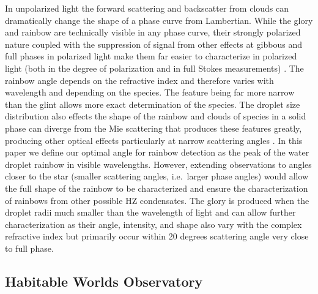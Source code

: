 \documentclass[
    usenatbib,
]{mnras}
\begin{document}
In unpolarized light the forward scattering and backscatter from clouds can dramatically change the shape of a phase curve from Lambertian.
%
While the glory and rainbow are technically visible in any phase curve, their strongly polarized nature coupled with the suppression of signal from other effects at gibbous and full phases in polarized light make them far easier to characterize in polarized light (both in the degree of polarization and in full Stokes measurements) \citep{karalidi2011, stam2008, treesandstam2019}.
%
The rainbow angle depends on the refractive index and therefore varies with wavelength and depending on the species.
%
The feature being far more narrow than the glint allows more exact determination of the species.
%
The droplet size distribution also effects the shape of the rainbow and clouds of species in a solid phase can diverge from the Mie scattering that produces these features greatly, producing other optical effects particularly at narrow scattering angles \citep{bailey2007, hansentravis1974, Karalidi2012ice}.
%
In this paper we define our optimal angle for rainbow detection as the peak of the water droplet rainbow in visible wavelengths.
%
However, extending observations to angles closer to the star (smaller scattering angles, i.e.\ larger phase angles) would allow the full shape of the rainbow to be characterized and ensure the characterization of rainbows from other possible HZ condensates.
%
The glory is produced when the droplet radii much smaller than the wavelength of light and can allow further characterization as their angle, intensity, and shape also vary with the complex refractive index but primarily occur within 20 degrees scattering angle very close to full phase. 
%

\subsection{Habitable Worlds Observatory}
\end{document}
